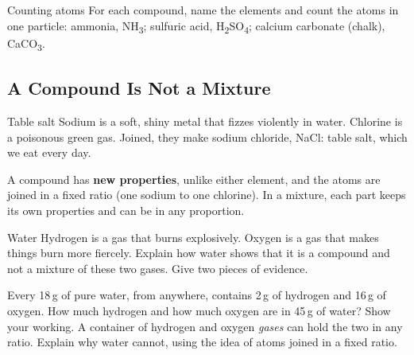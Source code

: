 \begin{wedo}{Counting atoms}
For each compound, name the elements and count the atoms in one particle: ammonia, NH\textsubscript{3}; sulfuric acid, H\textsubscript{2}SO\textsubscript{4}; calcium carbonate (chalk), CaCO\textsubscript{3}.
\answerbox{5cm}
\end{wedo}

\subsection{A Compound Is Not a Mixture}\label{sub:a1.2}

\begin{workedex}{Table salt}
Sodium is a soft, shiny metal that fizzes violently in water. Chlorine is a poisonous green gas. Joined, they make sodium chloride, NaCl: table salt, which we eat every day.

\smallskip
A compound has \textbf{new properties}, unlike either element, and the atoms are joined in a fixed ratio (one sodium to one chlorine). In a mixture, each part keeps its own properties and can be in any proportion.
\end{workedex}

\begin{wedo}{Water}
Hydrogen is a gas that burns explosively. Oxygen is a gas that makes things burn more fiercely. Explain how water shows that it is a compound and not a mixture of these two gases. Give two pieces of evidence.
\answerbox{5cm}
\end{wedo}

\label{prac:1}



\label{ext:1}

\task Every 18\,g of pure water, from anywhere, contains 2\,g of hydrogen and 16\,g of oxygen.
 How much hydrogen and how much oxygen are in 45\,g of water? Show your working.
\workbox{4cm}
 A container of hydrogen and oxygen \emph{gases} can hold the two in any ratio. Explain why water cannot, using the idea of atoms joined in a fixed ratio.
\answerbox{4.5cm}

\clearpage

\setcounter{section}{1}\renewcommand{\lessonart}{19}
\label{sec:2}

